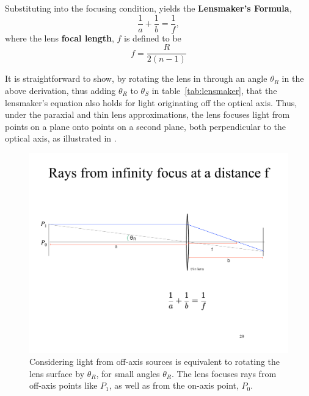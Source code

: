 Substituting \eqn{\ref{eq:ts2}} into the focusing condition, 
\eqn{\ref{eq:ts1}} yields the {\bf Lensmaker's Formula},
\begin{equation}
\frac{1}{a} + \frac{1}{b} = \frac{1}{f},
\label{eq:lensmaker}
\end{equation}
where the lens {\bf focal length}, $f$ is defined to be
\begin{equation}
    f = \frac{R}{2(n-1)}
\end{equation}

It is straightforward to show, by rotating the lens in  through an angle $\theta_R$ in the above derivation, thus adding $\theta_R$ to $\theta_S$ in table~\ref{tab:lensmaker},
that the lensmaker's equation also holds for light originating off the optical axis.   Thus, under the paraxial and thin lens approximations, the lens focuses light from points on a plane onto points on a second plane, both perpendicular to the optical axis, as illustrated in \fig{\ref{fig:rotatedLens}}.


\begin{figure}
\centerline{
\includegraphics[width=1\linewidth]{figures/imaging/offAxis.pdf}}
\caption{Considering light from off-axis sources is equivalent to rotating the lens surface by $\theta_R$, for small angles $\theta_R$.  The lens focuses rays from off-axis points like $P_1$, as well as from the on-axis point, $P_0$.}
\label{fig:rotatedLens}
\end{figure}


